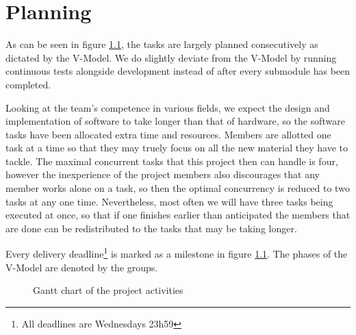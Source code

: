\chapter{Planning}
As can be seen in figure \ref{fig:gantt}, the tasks are largely planned consecutively as dictated by the V-Model\cite{vmodel}. We do slightly deviate from the V-Model by running continuous tests alongside development instead of after every submodule has been completed.

Looking at the team's competence in various fields, we expect the design and implementation of software to take longer than that of hardware, so the software tasks have been allocated extra time and resources. Members are allotted one task at a time so that they may truely focus on all the new material they have to tackle. The maximal concurrent tasks that this project then can handle is four, however the inexperience of the project members also discourages that any member works alone on a task, so then the optimal concurrency is reduced to two tasks at any one time. Nevertheless, most often we will have three tasks being executed at once, so that if one finishes earlier than anticipated the members that are done can be redistributed to the tasks that may be taking longer.

Every delivery deadline\footnote{All deadlines are Wednesdays 23h59} is marked as a milestone in figure \ref{fig:gantt}. The phases of the V-Model are denoted by the groups.

\begin{figure}
\centering
\begin{gantt}{21}{8}
	\begin{ganttitle}
	\end{ganttitle}





\end{gantt}
\caption{Gantt chart of the project activities}
\label{fig:gantt}
\end{figure}

